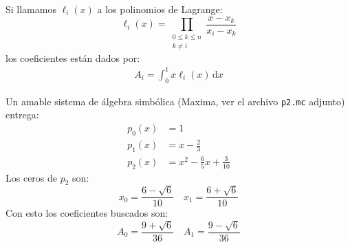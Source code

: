 \documentclass[english, spanish, fleqn]{article}
\begin{document}
\begin{enumerate}
    Si llamamos \(\ell_i(x)\) a los polinomios de Lagrange:
    \begin{equation*}
      \ell_i(x)
	= \prod_{\substack{0 \le k \le n \\
			   k \ne i}}
	    \frac{x - x_k}{x_i - x_k}
    \end{equation*}
    los coeficientes están dados por:
    \begin{align*}
      A_i
	= \int_0^1 x \ell_i(x) \, \mathrm{d} x
    \end{align*}

    Un amable sistema de álgebra simbólica
    (Maxima,
     ver el archivo \texttt{p2.mc} adjunto)
    entrega:
    \begin{align*}
      p_0(x)
	&= 1 \\
      p_1(x)
	&= x - \frac{2}{3} \\
      p_2(x)
	&= x^2 - \frac{6}{5} x + \frac{3}{10}
    \end{align*}
    Los ceros de \(p_2\) son:
    \begin{equation*}
      x_0
	= \frac{6 - \sqrt{6}}{10}
      \quad
      x_1
	= \frac{6 + \sqrt{6}}{10}
    \end{equation*}
    Con esto los coeficientes buscados son:
    \begin{equation*}
      A_0
	= \frac{9 + \sqrt{6}}{36}
      \quad
      A_1
	= \frac{9 - \sqrt{6}}{36}
    \end{equation*}


\end{enumerate}
\end{document}

